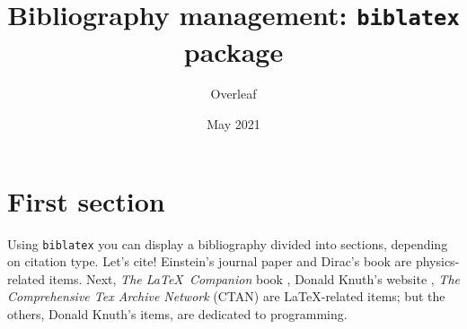 \documentclass{article}
\title{Bibliography management: \texttt{biblatex} package}
\author{Overleaf}
\date{May 2021}
\begin{document}
\maketitle

\tableofcontents

\section{First section}

Using \texttt{biblatex} you can display a bibliography divided into sections, depending on citation type. 
Let's cite! Einstein's journal paper \cite{einstein} and Dirac's book \cite{dirac} are physics-related items. 
Next, \textit{The \LaTeX\ Companion} book \cite{latexcompanion}, Donald Knuth's website \cite{knuthwebsite}, \textit{The Comprehensive Tex Archive Network} (CTAN) \cite{ctan} are \LaTeX-related items; but the others, Donald Knuth's items, \cite{knuth-fa,knuth-acp} are dedicated to programming. 

\medskip

\printbibliography[
heading=bibintoc,
title={Whole bibliography}
] %

\printbibliography[heading=subbibintoc,type=article,title={Articles only}]
\printbibliography[type=book,title={Books only}]

\printbibliography[keyword={physics},title={Physics-related only}]
\printbibliography[keyword={latex},title={\LaTeX-related only}]
\end{document}
